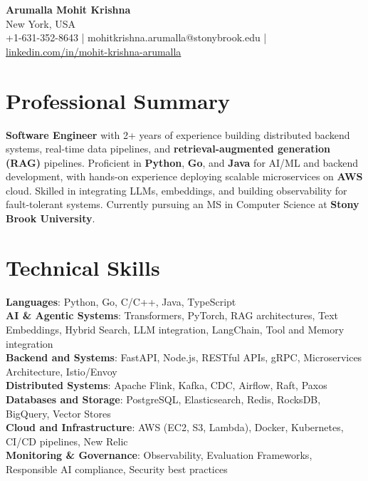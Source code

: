 \documentclass[letterpaper,11pt]{article}
\begin{document}
\begin{center}
  {\Large \textbf{Arumalla Mohit Krishna}} \\
  New York, USA \\
  +1-631-352-8643 \enspace | \enspace mohitkrishna.arumalla@stonybrook.edu \enspace | \enspace \href{https://www.linkedin.com/in/mohit-krishna-arumalla}{linkedin.com/in/mohit-krishna-arumalla}
\end{center}

\section{Professional Summary}
  \begin{itemize}[leftmargin=0.15in, label={}]
    \small{\item{
     \textbf{Software Engineer} with 2+ years of experience building distributed backend systems, real-time data pipelines, and \textbf{retrieval-augmented generation (RAG)} pipelines. Proficient in \textbf{Python}, \textbf{Go}, and \textbf{Java} for AI/ML and backend development, with hands-on experience deploying scalable microservices on \textbf{AWS} cloud. Skilled in integrating LLMs, embeddings, and building observability for fault-tolerant systems. Currently pursuing an MS in Computer Science at \textbf{Stony Brook University}.
    }}
  \end{itemize}
\vspace{-16pt}

\section{Technical Skills}
 \begin{itemize}[leftmargin=0.15in, label={}]
    \small{\item{
     \textbf{Languages}: Python, Go, C/C++, Java, TypeScript \\
     \textbf{AI \& Agentic Systems}: Transformers, PyTorch, RAG architectures, Text Embeddings, Hybrid Search, LLM integration, LangChain, Tool and Memory integration \\
     \textbf{Backend and Systems}: FastAPI, Node.js, RESTful APIs, gRPC, Microservices Architecture, Istio/Envoy \\
     \textbf{Distributed Systems}: Apache Flink, Kafka, CDC, Airflow, Raft, Paxos \\
     \textbf{Databases and Storage}: PostgreSQL, Elasticsearch, Redis, RocksDB, BigQuery, Vector Stores \\
     \textbf{Cloud and Infrastructure}: AWS (EC2, S3, Lambda), Docker, Kubernetes, CI/CD pipelines, New Relic \\
     \textbf{Monitoring \& Governance}: Observability, Evaluation Frameworks, Responsible AI compliance, Security best practices
    }}
 \end{itemize}
\vspace{-16pt}
\end{document}
